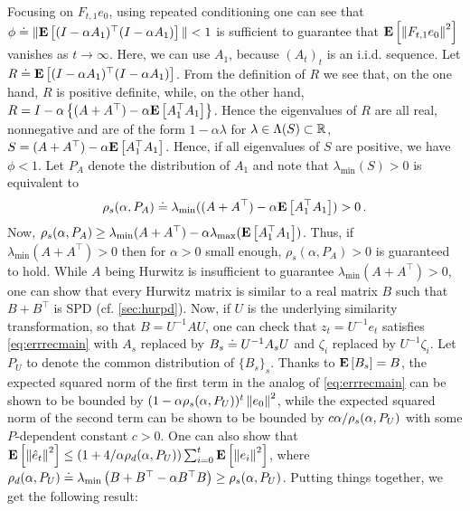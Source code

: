 \iffalse
From \eqref{eq:errrecmain}, it is clear that the magnitude of $\hat e_t$ is governed by the behavior
of the products $\Pi_{s=i+1}^{t}(I-\alpha A_s)$, $j=0,\dots,t$. 
Here, we will perform some crude upper bounding and derive simple sufficient conditions that guarantee that on expectation these product matrices are ``small''. However, we will show that the error bounds derived are tight in a worst-case sense.
\fi
Focusing on $F_{t,1} e_0$, using repeated conditioning one can see that
$\phi \doteq \|  \mathbf{E}\left[ (I-\alpha A_1)^\top (I-\alpha A_1)\right] \|<1$ is sufficient 
 to guarantee that $\mathbf{E}\left[\left\| F_{t,1}e_0\right\|^2\right]$ vanishes as $t\to\infty$.
Here, we can use $A_1$, because $(A_t)_t$ is an i.i.d. sequence.
Let $R \doteq \mathbf{E}\left[ (I-\alpha A_1)^\top (I-\alpha A_1)\right]$.
From the definition of $R$ we see that, on the one hand, $R$ is positive
definite, while, on the other hand,
$R= I - \alpha \left\{(A+A^\top) -\alpha \mathbf{E}\left[A_1^\top A_1\right]\right\}$.
Hence the eigenvalues of $R$ are all real, nonnegative
and are of the form $1-\alpha \lambda$ for $\lambda \in \Lambda(S) \subset \mathbb{R}$,
$S = (A+A^\top) -\alpha \mathbf{E}\left[A_1^\top A_1\right]$.
Hence, if all eigenvalues of $S$ are positive, we have
$\phi<1$. 
Let $P_A$ denote the distribution of $A_1$ and note that $\lambda_{\min}(S)>0$ is equivalent to
\begin{align}\label{def:spect}
\rho_s(\alpha,P_A) \doteq \lambda_{\min} ((A+A^\top) -\alpha \mathbf{E}\left[A_1^\top A_1\right] )>0\,.
\end{align}
Now,
$\rho_s(\alpha,P_A) \ge \lambda_{\min}( A+A^\top ) - \alpha \lambda_{\max} (\mathbf{E}\left[ A_1^\top A_1\right])$. Thus, if $\lambda_{\min}(A+A^\top)>0$ then for $\alpha>0$ small enough, $\rho_s(\alpha,P_A)>0$ is guaranteed to hold. While $A$ being Hurwitz is insufficient to guarantee $\lambda_{\min}(A+A^\top)>0$, one can show that every Hurwitz matrix is similar to a real matrix $B$ such that $B+B^\top$ is SPD (cf. \cref{sec:hurpd}). 
Now, if $U$ is the underlying similarity transformation, so that $B=U^{-1} A U$, one can check that $z_t = U^{-1} e_t$ satisfies \eqref{eq:errrecmain} with $A_s$ replaced by $B_s \doteq U^{-1} A_s U$ and $\zeta_i$ replaced by $U^{-1} \zeta_i$. Let $P_U$ to denote the common distribution of $\{B_s\}_s$.
Thanks to $\mathbf{E}\left[B_s\right] = B$, the expected squared norm of the first term in the analog of  \eqref{eq:errrecmain} can be shown to be bounded by $(1-\alpha \rho_s(\alpha,P_U))^t\left\| e_0\right\|^2$, 
while the expected squared norm of the second term can be shown to be bounded by $c \alpha /\rho_s(\alpha,P_U)$ with some $P$-dependent constant $c>0$. One can also show that $\mathbf{E}\left[\left\| \hat e_t\right\|^2\right]\le (1+4/\alpha \rho_d(\alpha,P_U)) \sum_{i=0}^t \mathbf{E}\left[ \left\| e_i\right\|^2 \right]$, where $\rho_d(\alpha,P_U) \doteq \lambda_{\min}\left(B+B^\top - \alpha B^\top B\right)\ge\rho_s(\alpha,P_U)$. Putting things together, we get the following result:
